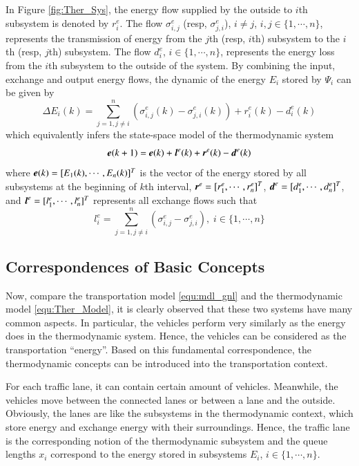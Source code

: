 \documentclass[preprint,authoryear,12pt]{elsarticle}
\renewcommand{\vec}[1]{\mbox{\boldmath$#1$}}
\begin{document}
In Figure \ref{fig:Ther_Sys}, the energy flow supplied by the outside to $i$th subsystem is denoted by $r^e_i$. The flow $\sigma^e_{i,j}$ (resp, $\sigma^e_{j,i}$), $i\neq j$, $i,j\in \{1,\cdots,n\}$, represents the transmission of energy from the $j$th (resp, $i$th) subsystem to the $i$th (resp, $j$th) subsystem. The flow $d^e_i$, $i\in \{1,\cdots,n\}$, represents the energy loss from the $i$th subsystem to the outside of the system. By combining the input, exchange and output energy flows, the dynamic of the energy $E_i$ stored by $\Psi_i$ can be given by
\begin{equation}\label{equ:Ther_Model_SubSystem}
\Delta E_i(k) = \sum_{j=1,j\neq
i}^{n}(\sigma^e_{i,j}(k)-\sigma^e_{j,i}(k))+r^e_i(k)-d^e_i(k)
\end{equation}
which equivalently infers the state-space model of the thermodynamic system
\begin{equation}\label{equ:Ther_Model}
    \vec{e}(k+1)=\vec{e}(k)+\vec{l}^e(k)+\vec{r}^e(k)-\vec{d}^e(k)
\end{equation}
where $\vec{e}(k)=[E_1(k),\cdots,E_n(k)]^T$ is the vector of the energy stored by all subsystems at the beginning of $k$th interval, $\vec{r}^e=[r^e_1,\cdots,r^e_n]^T$, $\vec{d}^e=[d^e_{1},\cdots,d^e_{n}]^T$, and $\vec{l}^e=[l^e_1,\cdots,l^e_n]^T$ represents all exchange flows such that
\begin{equation*}
l^e_i = \sum_{j=1,j\neq i}^{n}
        (\sigma^e_{i,j}-\sigma^e_{j,i}),
\; i\in \{1,\cdots,n\}
\end{equation*}

\subsection{Correspondences of Basic Concepts}

Now, compare the transportation model \eqref{equ:mdl_gnl} and the thermodynamic model \eqref{equ:Ther_Model}, it is clearly observed that these two systems have many common aspects. In particular, the vehicles perform very similarly as the energy does in the thermodynamic system. Hence, the vehicles can be considered as the transportation ``energy''. Based on this fundamental correspondence, the thermodynamic concepts can be introduced into the transportation context.

For each traffic lane, it can contain certain amount of vehicles. Meanwhile, the vehicles move between the connected lanes or between a lane and the outside. Obviously, the lanes are like the subsystems in the thermodynamic context, which store energy and exchange energy with their surroundings. Hence, the traffic lane is the corresponding notion of the thermodynamic subsystem and the queue lengths $x_i$ correspond to the energy stored in subsystems $E_i$, $i\in\{1,\cdots,n\}$.
\end{document}
